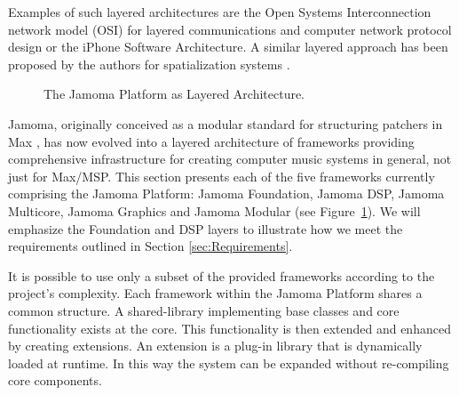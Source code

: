 \documentclass[twoside,10pt]{article}
\begin{document}
Examples of such layered architectures are the Open Systems Interconnection network model (OSI) \cite{web6} 
for layered communications and computer network protocol design or the iPhone Software Architecture. A similar layered approach has been proposed by the authors for spatialization systems \cite{Peters:2009}. 


\begin{figure}[htbp]
\centerline{}
\caption{The Jamoma Platform as Layered Architecture.}
\label{fig:layers}
\end{figure}

Jamoma, originally conceived as a modular standard for structuring patchers in Max \cite{Place:2006}, has now evolved into a layered architecture of frameworks providing comprehensive infrastructure for creating computer music systems in general, not just for Max/MSP.  This section presents each of the five frameworks currently comprising the Jamoma Platform: Jamoma Foundation, Jamoma DSP, Jamoma Multicore, Jamoma Graphics and Jamoma Modular (see Figure~\ref{fig:layers}).  We will emphasize the Foundation and DSP layers to illustrate how we meet the requirements outlined in Section \ref{sec:Requirements}.
 
  
It is possible to use only a subset of the provided frameworks according to the project's complexity. 
Each framework within the Jamoma Platform shares a common structure.  A shared-library implementing base classes and core functionality exists at the core.  This functionality is then extended and enhanced by creating extensions.  An extension is a plug-in library that is dynamically loaded at runtime.  In this way the system can be expanded without re-compiling core components.
\end{document}
